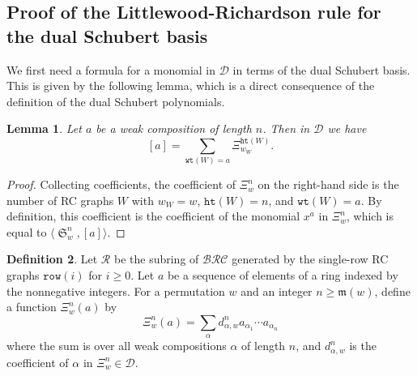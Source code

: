 \documentclass{amsart}
\makeatletter
\newcommand{\sqcupplus@inner}[2]{%
  \vcenter{\hbox{\ooalign{%
    \hfil$\m@th#1\sqcup$\hfil\cr
    \hfil\raisebox{0.15ex}{$\m@th#1\scriptscriptstyle+$}\hfil\cr
  }}}%
}
\newcommand{\sqcupplus}{\mathbin{\mathpalette\sqcupplus@inner\relax}}
\newtheorem{lemma}{Lemma}[subsection]
\theoremstyle{definition}
\newtheorem{definition}[lemma]{Definition}
\theoremstyle{remark}
\numberwithin{equation}{subsection}
\DeclareMathOperator{\sch}{\mathfrak{S}}
\newcommand{\wof}[1]{w_{#1}}
\newcommand{\wtt}{\mathtt{wt}}
\newcommand{\hr}{\mathtt{ht}}
\newcommand{\BRC}{\mathcal{BRC}}
\newcommand{\dsch}{\ensuremath{\Xi}}
\newcommand{\dcoma}{\mathcal{D}}
\newcommand{\maxd}{\mathfrak{m}}
\makeatother
\begin{document}
\subsection{Proof of the Littlewood-Richardson rule for the dual Schubert basis}

We first need a formula for a monomial in $\dcoma$ in terms of the dual Schubert basis. This is given by the following lemma, which is a direct consequence of the definition of the dual Schubert polynomials.

\begin{lemma} \label{lemma:sumform}
Let $a$ be a weak composition of length $n$. Then in $\dcoma$ we have
$$[a] = \sum_{\wtt(W)=a}\dsch_{\wof{W}}^{\hr(W)}.$$
\end{lemma}
\begin{proof}
Collecting coefficients, the coefficient of $\dsch_w^n$ on the right-hand side is the number of RC graphs $W$ with $\wof{W}=w$, $\hr(W)=n$, and $\wtt(W)=a$. By definition, this coefficient is the coefficient of the monomial $x^a$ in $\dsch_w^n$, which is equal to $\langle \sch_w^n, [a]\rangle$.
\end{proof}

\begin{definition}
Let $\mathcal{R}$  be the subring of $\BRC$ generated by the single-row RC graphs $\mathtt{row}(i)$ for $i\geq 0$. Let $a$ be a sequence of elements of a ring indexed by the nonnegative integers. For a permutation $w$ and an integer $n\geq \maxd(w)$, define a function $\dsch_w^n(a)$ by
$$\dsch_w^n(a) = \sum_{\alpha} d_{\alpha, w}^n a_{\alpha_1} \cdots a_{\alpha_n}$$
where the sum is over all weak compositions $\alpha$ of length $n$, and $d_{\alpha, w}^n$ is the coefficient of $\alpha$ in $\dsch_w^n\in\dcoma$.
\end{definition}
\end{document}
